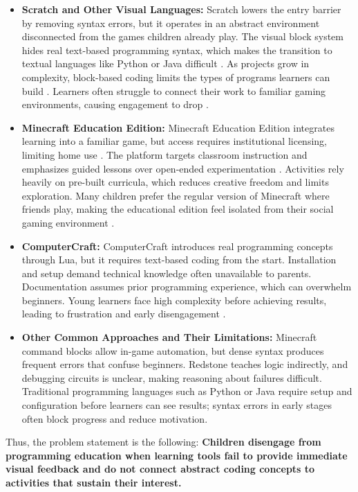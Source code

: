 \begin{itemize}
    \item[\textbf{--}] \textbf{Scratch and Other Visual Languages:}
    Scratch lowers the entry barrier by removing syntax errors, but it operates in an abstract environment disconnected from the games children already play. 
    The visual block system hides real text-based programming syntax, which makes the transition to textual languages like Python or Java difficult \cite{noauthor_connecting_2024}. 
    As projects grow in complexity, block-based coding limits the types of programs learners can build \cite{guide_scratch_2023}. 
    Learners often struggle to connect their work to familiar gaming environments, causing engagement to drop \cite{adler_improving_nodate}.

    \item[\textbf{--}] \textbf{Minecraft Education Edition:}
    Minecraft Education Edition integrates learning into a familiar game, but access requires institutional licensing, limiting home use \cite{noauthor_licensing_nodate}. 
    The platform targets classroom instruction and emphasizes guided lessons over open-ended experimentation \cite{noauthor_pros_2025}. 
    Activities rely heavily on pre-built curricula, which reduces creative freedom and limits exploration. 
    Many children prefer the regular version of Minecraft where friends play, making the educational edition feel isolated from their social gaming environment \cite{sripan_gamified_2025}.

    \item[\textbf{--}] \textbf{ComputerCraft:}
    ComputerCraft introduces real programming concepts through Lua, but it requires text-based coding from the start. 
    Installation and setup demand technical knowledge often unavailable to parents. 
    Documentation assumes prior programming experience, which can overwhelm beginners. 
    Young learners face high complexity before achieving results, leading to frustration and early disengagement \cite{kazemitabaar_scaffolding_2023}.

    \item[\textbf{--}] \textbf{Other Common Approaches and Their Limitations:}
    Minecraft command blocks allow in-game automation, but dense syntax produces frequent errors that confuse beginners. 
    Redstone teaches logic indirectly, and debugging circuits is unclear, making reasoning about failures difficult. 
    Traditional programming languages such as Python or Java require setup and configuration before learners can see results; syntax errors in early stages often block progress and reduce motivation.
\end{itemize}


Thus, the problem statement is the following: \textbf{Children disengage from programming education when learning tools fail to provide immediate visual feedback and do not connect abstract coding concepts to activities that sustain their interest.}